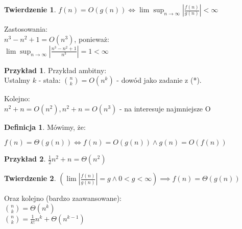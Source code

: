 \documentclass{article}
\theoremstyle{definition}
\newtheorem{de}{Definicja}[subsection]
\theoremstyle{definition}
\newtheorem{tw}{Twierdzenie}[subsection]
\theoremstyle{definition}
\newtheorem{pk}{Przykład}[subsection]
\theoremstyle{definition}
\begin{document}
\begin{tw}
    $f(n) = O(g(n)) \iff \lim \sup_{n\rightarrow \infty} \left|\frac{f(n)}{g(n)}\right|<\infty$
\end{tw}
Zastosowania:\\
$n^3-n^2+1=O(n^3)$, ponieważ:\\
$\lim \sup_{n\rightarrow \infty} \left|\frac{n^3-n^2+1}{n^3}\right|=1<\infty$

\begin{pk}
    Przykład ambitny:\\
    Ustalmy $k$ - stała:
    $\binom{n}{k}=O(n^k)$ - dowód jako zadanie z (*).
\end{pk}

Kolejno:\\
$n^2+n=O(n^2), n^2+n=O(n^3)$ - na interesuje najmniejsze O

\begin{de}
    Mówimy, że:
    \begin{center}
        $f(n) = \Theta(g(n))\iff f(n)=O(g(n)) \land g(n)=O(f(n))$
    \end{center}
\end{de}

\begin{pk}
    $\frac{1}{2} n^2 + n = \Theta(n^2)$
\end{pk}

\begin{tw}
$\left(\lim \left|\frac{f(n)}{g(n)}\right|=g \land 0<g<\infty \right)\implies f(n)=\Theta(g(n))$
\end{tw}

Oraz kolejno (bardzo zaawansowane):\\
$\binom{n}{k}=\Theta (n^k)$\\
$\binom{n}{k}=\frac{1}{k!} n^k + \Theta(n^{k-1})$
\end{document}
